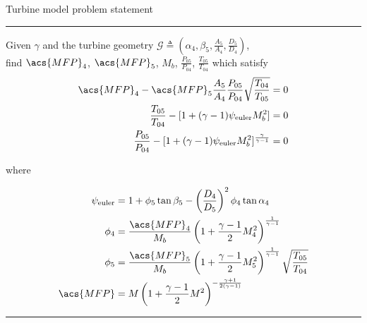 \documentclass[tcc]{subfiles}
\begin{document}
\begin{table}
\centering
    \caption{Turbine model problem statement}
\begin{minipage}{0.7\textwidth}
    \hrule

    Given $\gamma$ and the turbine geometry 
    $\mathcal{G} \triangleq \left(
    \alpha_4, \beta_5, \tfrac{A_5}{A_4}, \tfrac{D_{5}}{D_4} \right)$, \\
    find $\acs{MFP}_4$, $\acs{MFP}_5$, $M_b$, $\frac{P_{05}}{P_{04}}$, $\frac{T_{05}}{T_{04}}$ 
    which satisfy
\begin{align}
    \acs{MFP}_4 - \acs{MFP}_5\frac{A_5}{A_4}\frac{P_{05}}{P_{04}}\sqrt{\frac{T_{04}}{T_{05}}}    &= 0 \\
    \frac{T_{05}}{T_{04}} - [1 + (\gamma-1)\psi_{\text{euler}} M_b^2]                           &= 0 \\
    \frac{P_{05}}{P_{04}} - [1 + (\gamma-1)\psi_{\text{euler}} M_b^2]^{\frac{\gamma}{\gamma-1}} &= 0 
\end{align}

where

\begin{align}
    \psi_{\text{euler}} & = 1 + \phi_5\tan\beta_5-\left(\frac{D_4}{D_5}\right)^2\phi_4\tan\alpha_4 \\
    \phi_4 &= \frac{\acs{MFP}_4}{M_b} \left( 1 + \frac{\gamma-1}{2} M_4^2 \right)^{\frac{1}{\gamma-1}} \\
    \phi_5 &= \frac{\acs{MFP}_5}{M_b} \left( 1 + \frac{\gamma-1}{2} M_5^2 \right)^{\frac{1}{\gamma-1}} \sqrt{\frac{T_{05}}{T_{04}}}\\
    \acs{MFP} &= M \left( 1 + \frac{\gamma-1}{2} M^2 \right)^{-\frac{\gamma+1}{2(\gamma-1)}}
\end{align}

    \hrule
\end{minipage}
\end{table}
\end{document}
